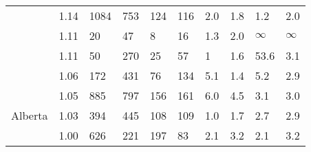 \documentclass[utf8]{FrontiersinHarvard} %
\begin{document}
\begin{table}[h]
\begin{ssmall}
\begin{tabular}{llllllllll}
			\cite{Yan:2021aa}                & 1.14      & 1084                                 & 753                                     & 124                          & 116                                        & 2.0       & 1.8       & 1.2       & 2.0       \\
			\cite{Chen:2023aa}               & 1.11      & 20                                   & 47                                      & 8                            & 16                                         & 1.3       & 2.0       & $\infty$  & $\infty$  \\
			\cite{Leal:2020aa}               & 1.11      & 50                                   & 270                                     & 25                           & 57                                         & 1         & 1.6       & 53.6      & 3.1       \\
			\cite{Perez-Losada:2017aa}       & 1.06      & 172                                  & 431                                     & 76                           & 134                                        & 5.1       & 1.4       & 5.2       & 2.9       \\
			\cite{liu_dynamics_2020}         & 1.05      & 885                                  & 797                                     & 156                          & 161                                        & 6.0       & 4.5       & 3.1       & 3.0       \\ %
			\cite{chato_public_2020} Alberta & 1.03      & 394                                  & 445                                     & 108                          & 109                                        & 1.0       & 1.7       & 2.7       & 2.9       \\
			\cite{Fabeni:2020aa}             & 1.00      & 626                                  & 221                                     & 197                          & 83                                         & 2.1       & 3.2       & 2.1       & 3.2       \\

			\hline
		\end{tabular}
	\end{ssmall}
\end{table}
\end{document}
